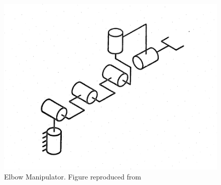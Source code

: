 \begin{figure}[tb!]
	\centering
	\includegraphics[width=.8\columnwidth]{elbow_manip.png}
	\caption{Elbow Manipulator. Figure reproduced from ~\cite{PadenThesis85}}
	\label{fig:elbow_manip}
\end{figure}
%
